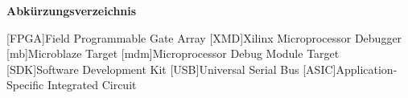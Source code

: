 
{\textbf{Abkürzungsverzeichnis}}

\begin{acronym}[Bash]
 [FPGA]{Field Programmable Gate Array}
 [XMD]{Xilinx Microprocessor Debugger}
 [mb]{Microblaze Target}
 [mdm]{Microprocessor Debug Module Target}
 [SDK]{Software Development Kit}
 [USB]{Universal Serial Bus}
  [ASIC]{Application-Specific Integrated Circuit}

\end{acronym}
